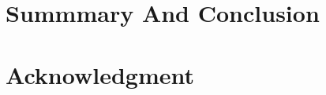\documentclass[10pt, conference, compsocconf]{IEEEtran}
\begin{document}

		
	
		

	
	\section{Summmary And Conclusion}


	
	\section*{Acknowledgment}
	
	
\end{document}
